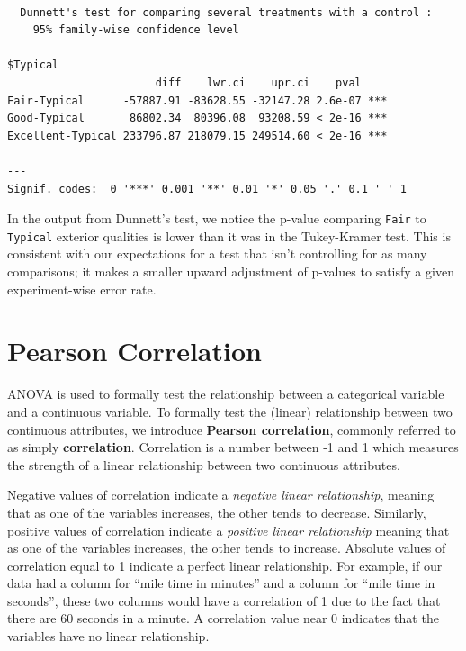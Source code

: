 \documentclass[
  letterpaper,
  DIV=11,
  numbers=noendperiod]{scrreprt}
\begin{document}
\begin{verbatim}

  Dunnett's test for comparing several treatments with a control :  
    95% family-wise confidence level

$Typical
                       diff    lwr.ci    upr.ci    pval    
Fair-Typical      -57887.91 -83628.55 -32147.28 2.6e-07 ***
Good-Typical       86802.34  80396.08  93208.59 < 2e-16 ***
Excellent-Typical 233796.87 218079.15 249514.60 < 2e-16 ***

---
Signif. codes:  0 '***' 0.001 '**' 0.01 '*' 0.05 '.' 0.1 ' ' 1
\end{verbatim}

In the output from Dunnett's test, we notice the p-value comparing
\texttt{Fair} to \texttt{Typical} exterior qualities is lower than it
was in the Tukey-Kramer test. This is consistent with our expectations
for a test that isn't controlling for as many comparisons; it makes a
smaller upward adjustment of p-values to satisfy a given experiment-wise
error rate.

\hypertarget{sec-cor}{%
\section{Pearson Correlation}\label{sec-cor}}

ANOVA is used to formally test the relationship between a categorical
variable and a continuous variable. To formally test the (linear)
relationship between two continuous attributes, we introduce
\textbf{Pearson correlation}, commonly referred to as simply
\textbf{correlation}. Correlation is a number between -1 and 1 which
measures the strength of a linear relationship between two continuous
attributes.

Negative values of correlation indicate a \emph{negative linear
relationship}, meaning that as one of the variables increases, the other
tends to decrease. Similarly, positive values of correlation indicate a
\emph{positive linear relationship} meaning that as one of the variables
increases, the other tends to increase. Absolute values of correlation
equal to 1 indicate a perfect linear relationship. For example, if our
data had a column for ``mile time in minutes'' and a column for ``mile
time in seconds'', these two columns would have a correlation of 1 due
to the fact that there are 60 seconds in a minute. A correlation value
near 0 indicates that the variables have no linear relationship.
\end{document}
